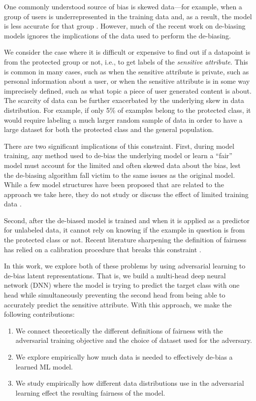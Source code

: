 \documentclass[sigconf,9pt]{acmart}
\begin{document}
One commonly understood source of bias is skewed data---for example, when a group of users is underrepresented in the training data and, as a result, the model is less accurate for that group \cite{beutel2017beyond,bolukbasi2016man}.  However, much of the recent work on de-biasing models ignores the implications of the data used to perform the de-biasing.

We consider the case where it is difficult or expensive to find out if a datapoint is from the protected group or not, i.e., to get labels of the \emph{sensitive attribute}.  This is common in many cases, such as when the sensitive attribute is private, such as personal information about a user, or when the sensitive attribute is in some way imprecisely defined, such as what topic a piece of user generated content is about.  The scarcity of data can be further exacerbated by the underlying skew in data distribution.  For example, if only 5\% of examples belong to the protected class, it would require labeling a much larger random sample of data in order to have a large dataset for both the protected class and the general population.  

There are two significant implications of this constraint.
First, during model training, any method used to de-bias the underlying model or learn a ``fair'' model must account for the limited and often skewed data about the bias, lest the de-biasing algorithm fall victim to the same issues as the original model.  
While a few model structures have been proposed that are related to the approach we take here, they do not study or discuss the effect of limited training data \cite{bousmalis2016domain,ganin2016domain}.

Second, after the de-biased model is trained and when it is applied as a predictor for unlabeled data, it cannot rely on knowing if the example in question is from the protected class or not.  Recent literature sharpening the definition of fairness has relied on a calibration procedure that breaks this constraint \cite{hardt2016equality,kleinberg2016inherent}.

In this work, we explore both of these problems by using adversarial learning to de-bias latent representations. That is, we build a multi-head deep neural network (DNN) where the model is trying to predict the target class with one head while simultaneously preventing the second head from being able to accurately predict the sensitive attribute.
With this approach,  we make the following contributions:
\begin{enumerate}
    \item We connect theoretically the different definitions of fairness with the adversarial training objective and the choice of dataset used for the adversary.
    \item We explore empirically how much data is needed to effectively de-bias a learned ML model.
    \item We study empirically how different data distributions use in the adversarial learning effect the resulting fairness of the model.
\end{enumerate}
\end{document}
